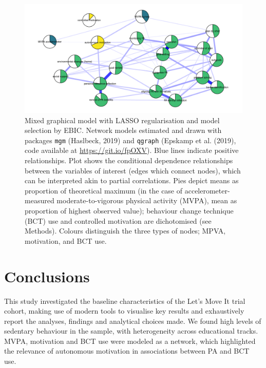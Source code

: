 \documentclass[british,man]{apa6}
\begin{document}
\begin{figure}
\centering
\includegraphics{_baseline-manuscript_files/figure-latex/network-plot-1.pdf}
\caption{\label{fig:network-plot}Mixed graphical model with LASSO regularisation and model selection by EBIC. Network models estimated and drawn with packages \texttt{mgm} (Haslbeck, 2019) and \texttt{qgraph} (Epskamp et al. (2019), code available at \url{https://git.io/fpOXV}). Blue lines indicate positive relationships. Plot shows the conditional dependence relationships between the variables of interest (edges which connect nodes), which can be interpreted akin to partial correlations. Pies depict means as proportion of theoretical maximum (in the case of accelerometer-measured moderate-to-vigorous physical activity (MVPA), mean as proportion of highest observed value); behaviour change technique (BCT) use and controlled motivation are dichotomised (see Methods). Colours distinguish the three types of nodes; MPVA, motivation, and BCT use.}
\end{figure}

\hypertarget{conclusions}{%
\section{Conclusions}\label{conclusions}}

This study investigated the baseline characteristics of the Let's Move It trial cohort, making use of modern tools to visualise key results and exhaustively report the analyses, findings and analytical choices made. We found high levels of sedentary behaviour in the sample, with heterogeneity across educational tracks. MVPA, motivation and BCT use were modeled as a network, which highlighted the relevance of autonomous motivation in associations between PA and BCT use.
\end{document}
